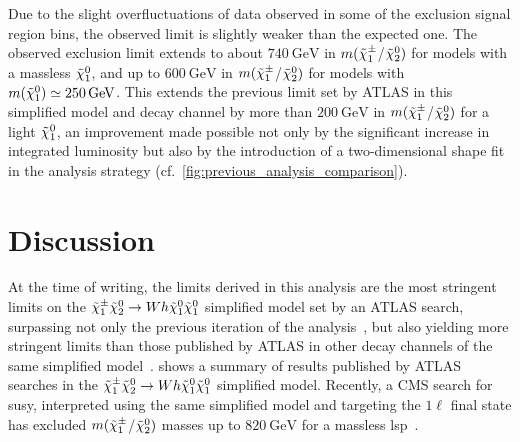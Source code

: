 Due to the slight overfluctuations of data observed in some of the exclusion signal region bins, the observed limit is slightly weaker than the expected one.
The observed exclusion limit extends to about $\SI{740}{\GeV}$ in \mbox{$m(\tilde{\chi}_1^\pm$/$\tilde{\chi}_2^0)$} for models with a massless $\tilde{\chi}_1^0$, and up to $\SI{600}{\GeV}$ in \mbox{$m(\tilde{\chi}_1^\pm$/$\tilde{\chi}_2^0)$} for models with $m(\lsp)\simeq\SI{250}{\GeV}$.
This extends the previous limit set by ATLAS in this simplified model and decay channel by more than $\SI{200}{\GeV}$ in \mbox{$m(\tilde{\chi}_1^\pm$/$\tilde{\chi}_2^0)$} for a light $\tilde{\chi}_1^0$, an improvement made possible not only by the significant increase in integrated luminosity but also by the introduction of a two-dimensional shape fit in the analysis strategy (cf.~\cref{fig:previous_analysis_comparison}). 

\section{Discussion}\label{sec:onelepton_discussion}

At the time of writing, the limits derived in this analysis are the most stringent limits on the $\tilde{\chi}_1^\pm\tilde{\chi}_2^0\rightarrow Wh\tilde{\chi}_1^0\tilde{\chi}_1^0$ simplified model set by an ATLAS search, surpassing not only the previous iteration of the analysis~\cite{SUSY-2017-01}, but also yielding more stringent limits than those published by ATLAS in other decay channels of the same simplified model~\cite{ATL-PHYS-PUB-2021-007}.
 shows a summary of results published by ATLAS searches in the $\tilde{\chi}_1^\pm\tilde{\chi}_2^0\rightarrow Wh\tilde{\chi}_1^0\tilde{\chi}_1^0$ simplified model.
Recently, a CMS search for \gls{susy}, interpreted using the same simplified model and targeting the $1\ell$ final state has excluded \mbox{$m(\tilde{\chi}_1^\pm$/$\tilde{\chi}_2^0)$} masses up to $\SI{820}{\GeV}$ for a massless \gls{lsp}~\cite{CMS-PAS-SUS-20-003}.

